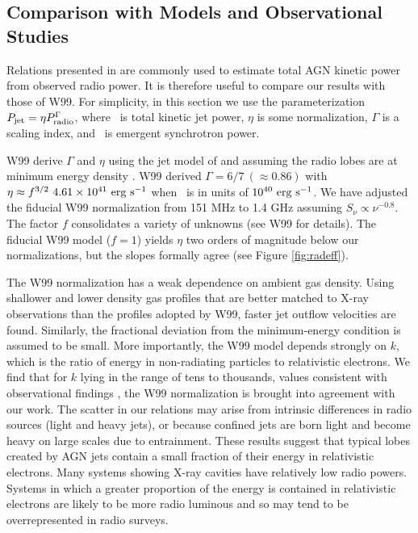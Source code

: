 \documentclass[12pt, preprint]{aastex}
\begin{document}
\subsection{Comparison with Models and Observational Studies}
\label{sec:models}

Relations presented in \citet[][hereafter W99]{w99} are commonly used
to estimate total AGN kinetic power from observed radio power. It is
therefore useful to compare our results with those of W99. For
simplicity, in this section we use the parameterization $P_{\rm{jet}} = \eta
P_{\rm{radio}}^{\Gamma}$, where \pjet\ is total kinetic jet power, $\eta$ is
some normalization, $\Gamma$ is a scaling index, and \prad\ is
emergent synchrotron power.

W99 derive $\Gamma$ and $\eta$ using the jet model of
\citet{1991MNRAS.250..581F} and assuming the radio lobes are at
minimum energy density \citep[see][for
  details]{1980ARA&A..18..165M}. W99 derived $\Gamma = 6/7 ~(\approx
0.86)$ with $\eta \approx f^{3/2}~4.61 \times 10^{41} ~\rm{\mbox{\ensuremath{\rm{erg}}}~\ensuremath{\rm{\mbox{\ensuremath{\rm{s}}}^{-1}}}}$ when
\prad\ is in units of $10^{40} ~\rm{\mbox{\ensuremath{\rm{erg}}}~\ensuremath{\rm{\mbox{\ensuremath{\rm{s}}}^{-1}}}}$. We have adjusted the fiducial
W99 normalization from 151 MHz to 1.4 GHz assuming $S_{\nu} \propto
\nu^{-0.8}$. The factor $f$ consolidates a variety of unknowns (see
W99 for details). The fiducial W99 model ($f=1$) yields $\eta$ two
orders of magnitude below our normalizations, but the slopes formally
agree (see Figure \ref{fig:radeff}).

The W99 normalization has a weak dependence on ambient gas density.
Using shallower and lower density gas profiles that are better matched
to X-ray observations than the profiles adopted by W99, faster jet
outflow velocities are found. Similarly, the fractional deviation from
the minimum-energy condition is assumed to be small. More importantly,
the W99 model depends strongly on $k$, which is the ratio of energy in
non-radiating particles to relativistic electrons. We find that for
$k$ lying in the range of tens to thousands, values consistent with
observational findings \citep{2005MNRAS.364.1343D,
  2006MNRAS.372.1741D, 2006ApJ...648..200D, birzan08}, the W99
normalization is brought into agreement with our work. The scatter in
our relations may arise from intrinsic differences in radio sources
(light and heavy jets), or because confined jets are born light and
become heavy on large scales due to entrainment. These results suggest
that typical lobes created by AGN jets contain a small fraction of
their energy in relativistic electrons. Many systems showing X-ray
cavities have relatively low radio powers.  Systems in which a greater
proportion of the energy is contained in relativistic electrons are
likely to be more radio luminous and so may tend to be overrepresented
in radio surveys.
\end{document}
